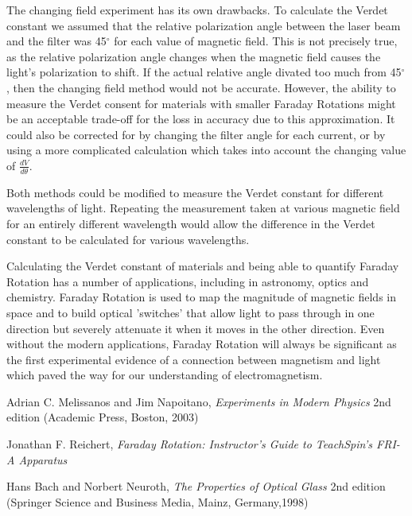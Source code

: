 \documentclass[prb,preprint]{revtex4-1}
\begin{document}
The changing field experiment has its own drawbacks. To calculate the Verdet constant we assumed that the relative polarization angle between the laser beam and the filter was 45$^{\circ}$ for each value of magnetic field. This is not precisely true, as the relative polarization angle changes when the magnetic field causes the light's polarization to shift.  If the actual relative angle divated too much from 45$^{\circ}$, then the changing field method would not be accurate. However, the ability to measure the Verdet consent for materials with smaller Faraday Rotations might be an acceptable trade-off for the loss in accuracy due to this approximation.  It could also be corrected for by changing the filter angle for each current, or by using a more complicated calculation which takes into account the changing value of $\frac{dV}{d\theta}$.

Both methods could be modified to measure the Verdet constant for different wavelengths of light. Repeating the measurement taken at various magnetic field for an entirely different wavelength would allow the difference in the Verdet constant to be calculated for various wavelengths.

Calculating the Verdet constant of materials and being able to quantify Faraday Rotation has a number of applications, including in astronomy, optics and chemistry. Faraday Rotation is used to map the magnitude of magnetic fields in space and to build optical 'switches' that allow light to pass through in one direction but severely attenuate it when it moves in the other direction. Even without the modern applications, Faraday Rotation will always be significant as the first experimental evidence of a connection between magnetism and light which paved the way for our understanding of electromagnetism.
 
\begin{thebibliography}{3}

 Adrian C. Melissanos and Jim Napoitano, \textit{Experiments in Modern Physics} 2nd edition (Academic Press, Boston, 2003)

 Jonathan F. Reichert, \textit{Faraday Rotation: Instructor's Guide to TeachSpin's FRI-A Apparatus}

 Hans Bach and Norbert Neuroth, \textit{The Properties of Optical Glass} 2nd edition (Springer Science and Business Media, Mainz, Germany,1998)

\end{thebibliography}
\end{document}
